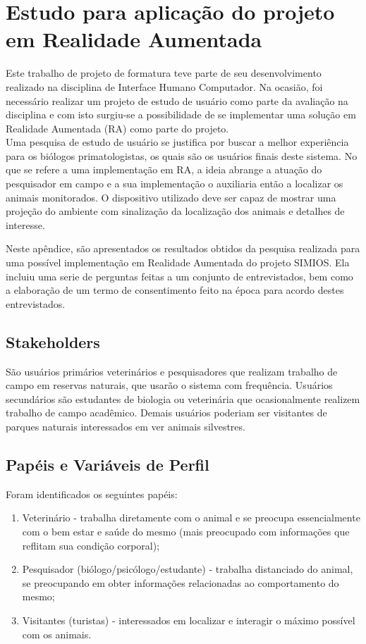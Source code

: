 \chapter{Estudo para aplicação do projeto em Realidade Aumentada}

Este trabalho de projeto de formatura teve parte de seu desenvolvimento realizado na disciplina de Interface Humano Computador. Na ocasião, foi necessário realizar um projeto de estudo de usuário como parte da avaliação na disciplina e com isto surgiu-se a possibilidade de se implementar uma solução em Realidade Aumentada (RA) como parte do projeto.\\

Uma pesquisa de estudo de usuário se justifica por buscar a melhor experiência para os biólogos primatologistas, os quais são os usuários finais deste sistema. No que se refere a uma implementação em RA, a ideia abrange a atuação do pesquisador em campo e a sua implementação o auxiliaria então a localizar os animais monitorados. O dispositivo utilizado deve ser capaz de mostrar uma projeção do ambiente com sinalização da localização dos animais e detalhes de interesse.

Neste apêndice, são apresentados os resultados obtidos da pesquisa realizada para uma possível implementação em Realidade Aumentada do projeto SIMIOS. Ela incluiu uma serie de perguntas feitas a um conjunto de entrevistados, bem como a elaboração de um termo de consentimento feito na época para acordo destes entrevistados.

\section{Stakeholders}

São usuários primários veterinários e pesquisadores que realizam trabalho de campo em reservas naturais, que usarão o sistema com frequência. Usuários secundários são estudantes de biologia ou veterinária que ocasionalmente realizem trabalho de campo acadêmico. Demais usuários poderiam ser visitantes de parques naturais interessados em ver animais silvestres.

\section{Papéis e Variáveis de Perfil}

Foram identificados os seguintes papéis:

\begin{enumerate}
\item Veterinário - trabalha diretamente com o animal e se preocupa essencialmente com o bem estar e saúde do mesmo (mais preocupado com informações que reflitam sua condição corporal);
\item Pesquisador (biólogo/psicólogo/estudante) - trabalha distanciado do animal, se preocupando em obter informações relacionadas ao comportamento do mesmo;
\item Visitantes (turistas) - interessados em localizar e interagir o máximo possível com os animais.
\end{enumerate}

